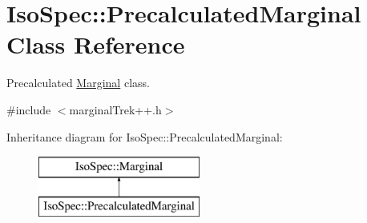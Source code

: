 \hypertarget{class_iso_spec_1_1_precalculated_marginal}{}\section{Iso\+Spec\+:\+:Precalculated\+Marginal Class Reference}
\label{class_iso_spec_1_1_precalculated_marginal}


Precalculated \mbox{\hyperlink{class_iso_spec_1_1_marginal}{Marginal}} class.  




{\ttfamily \#include $<$marginal\+Trek++.\+h$>$}

Inheritance diagram for Iso\+Spec\+:\+:Precalculated\+Marginal\+:\begin{figure}[H]
\begin{center}
\leavevmode
\includegraphics[height=2.000000cm]{class_iso_spec_1_1_precalculated_marginal}
\end{center}
\end{figure}
